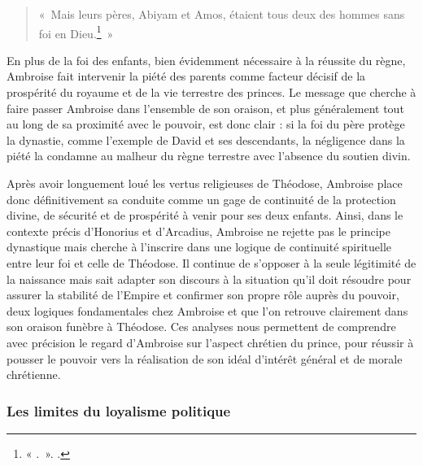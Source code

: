 \bigskip

\begin{quote}
«~Mais leurs pères, Abiyam et Amos, étaient tous deux des hommes sans foi en Dieu.\footnote{« .~». \cite[]{ambroise_mort_theodose}.}~»
\end{quote}

\bigskip

En plus de la foi des enfants, bien évidemment nécessaire à la réussite du règne, Ambroise fait intervenir la piété des parents comme facteur décisif de la prospérité du royaume et de la vie terrestre des princes. Le message que cherche à faire passer Ambroise dans l’ensemble de son oraison, et plus généralement tout au long de sa proximité avec le pouvoir, est donc clair : si la foi du père protège la dynastie, comme l’exemple de David et ses descendants, la négligence dans la piété la condamne au malheur du règne terrestre avec l’absence du soutien divin.

\bigskip

Après avoir longuement loué les vertus religieuses de Théodose, Ambroise place donc définitivement sa conduite comme un gage de continuité de la protection divine, de sécurité et de prospérité à venir pour ses deux enfants. Ainsi, dans le contexte précis d’Honorius et d'Arcadius, Ambroise ne rejette pas le principe dynastique mais cherche à l’inscrire dans une logique de continuité spirituelle entre leur foi et celle de Théodose. Il continue de s’opposer à la seule légitimité de la naissance mais sait adapter son discours à la situation qu’il doit résoudre pour assurer la stabilité de l’Empire et confirmer son propre rôle auprès du pouvoir, deux logiques fondamentales chez Ambroise et que l’on retrouve clairement dans son oraison funèbre à Théodose. Ces analyses nous permettent de comprendre avec précision le regard d'Ambroise sur l'aspect chrétien du prince, pour réussir à pousser le pouvoir vers la réalisation de son idéal d'intérêt général et de morale chrétienne.

\bigskip

\subsubsection{Les limites du loyalisme politique}

